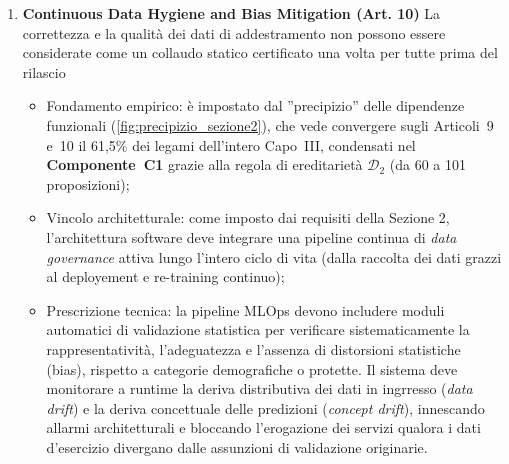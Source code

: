 \documentclass[12pt,a4paper,oneside]{report}
\begin{document}
\begin{enumerate}
    \begin{itemize}
        \item Fondamento empirico: scaturisce dalla netta separazione geometrica del \textbf{Componente~C7} nella tassellazione di Voronoi (\cref{fig:cluster_voronoi}) e nella proiezione PCA (\cref{fig:semantic_projection_2d}), dove i requisiti di trasparenza e supervisione formano un polo autonomo al confine tra fornitore e utilizzatore;
        \item Vincolo architetturale: le capacità di supervisione umana devoe costituire un blocco funzionale attivo e integrante del flusso di controllo dsel software (\emph{control-flow}). Il sistema deve essere architetturalmente programmato per impedire il completamento di un'operazione ad alto rischio in assenza di convalida umana (\emph{two-man rule} o approvazione esplicita), ogniqualcolta il modello operi con livelli di confidenza statistica inferiori a soglie prefissate o rilevi anomalie distribuzionali nei dati;
        \item Prescizione tecnica; il software deve esporre interfacce native di arresto immediato (\emph{kill-switch}) e meccanismi di sovrascrittura (\emph{manual override}), progettati per consentire all'operatore di interrompere l'esecuzione in qualsiasi istante e far collassare il sistema in uno stato sicuro, prevedibile e reversibile(\emph{fail-safe state}), azzerando gli effetti operativi delle inferenze errate.
    \end{itemize}

    \item \textbf{Continuous Data Hygiene and Bias Mitigation (Art. 10)}
    La correttezza e la qualità dei dati di addestramento non possono essere considerate come un collaudo statico certificato una volta per tutte prima del rilascio
    \begin{itemize}
        \item Fondamento empirico: è impostato dal ''precipizio'' delle dipendenze funzionali (\cref{fig:precipizio_sezione2}), che vede convergere sugli Articoli~9 e~10 il 61,5\% dei legami dell'intero Capo~III, condensati nel \textbf{Componente~C1} grazie alla regola di ereditarietà $\mathcal{D}_2$ (da 60 a 101 proposizioni);
        \item Vincolo architetturale: come imposto dai requisiti della Sezione 2, l'architettura software deve integrare una pipeline continua di \emph{data governance} attiva lungo l'intero ciclo di vita (dalla raccolta dei dati grazzi al deployement e re-training continuo);
        \item Prescrizione tecnica: la pipeline MLOps devono includere moduli automatici di validazione statistica per verificare sistematicamente la rappresentatività, l'adeguatezza e l'assenza di distorsioni statistiche (bias), rispetto a categorie demografiche o protette. Il sistema deve monitorare a runtime la deriva distributiva dei dati in ingrresso (\emph{data drift}) e la deriva concettuale delle predizioni (\emph{concept drift}), innescando allarmi architetturali e bloccando l'erogazione dei servizi qualora i dati d'esercizio divergano dalle assunzioni di validazione originarie.
    \end{itemize}


\end{enumerate}
\end{document}
